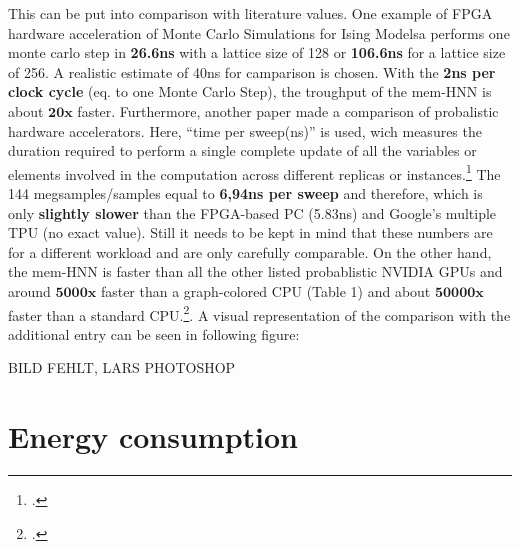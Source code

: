 This can be put into comparison with literature values. One example of \ac{FPGA} hardware acceleration of Monte Carlo Simulations for Ising Modelsa
performs one monte carlo step in \textbf{26.6ns} with a lattice size of 128 or \textbf{106.6ns} for a lattice size of 256.
A realistic estimate of 40ns for camparison is chosen. With the \textbf{2ns per clock cycle} (eq. to one Monte Carlo Step),
the troughput of the \ac{mem-HNN} is about \(\mathbf{20x}\) faster.
Furthermore, another paper made a comparison of probalistic hardware accelerators. Here, ``time per sweep(ns)'' is used, wich measures the duration required to perform a single complete update of all the variables or elements involved in the computation across different replicas or instances.\footcite[cf.][2]{aaditAcceleratingAdaptiveParallel2023}
The 144 megsamples/samples equal to \textbf{6,94ns per sweep} and therefore, which is only \textbf{slightly slower} than the FPGA-based PC (5.83ns) and Google’s
multiple TPU (no exact value). Still it needs to be kept in mind that these numbers are for a different workload and are only carefully comparable. 
On the other hand, the \ac{mem-HNN} is faster than all the other listed probablistic NVIDIA \ac{GPU}s and around \(\mathbf{5000x}\) faster than a graph-colored \ac{CPU} (Table 1) and about \(\mathbf{50000x}\) faster than a standard \ac{CPU}.\footcite[cf.][2]{aaditAcceleratingAdaptiveParallel2023}.
A visual representation of the comparison with the additional entry can be seen in following figure:

BILD FEHLT, LARS PHOTOSHOP

\section{Energy consumption}

